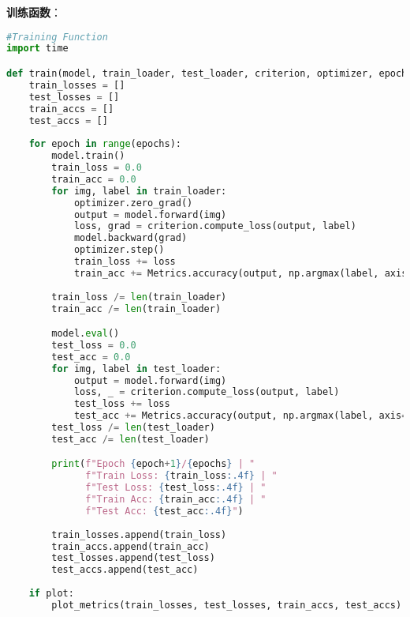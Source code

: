 \documentclass[a4paper, twocolumn]{article}
\begin{document}
\noindent \textbf{训练函数}：
\begin{lstlisting}[language=Python]
#Training Function
import time

def train(model, train_loader, test_loader, criterion, optimizer, epochs, plot=True):
    train_losses = []
    test_losses = []
    train_accs = []
    test_accs = []
    
    for epoch in range(epochs):
        model.train()
        train_loss = 0.0
        train_acc = 0.0
        for img, label in train_loader:
            optimizer.zero_grad()
            output = model.forward(img)
            loss, grad = criterion.compute_loss(output, label)
            model.backward(grad)
            optimizer.step()
            train_loss += loss
            train_acc += Metrics.accuracy(output, np.argmax(label, axis=1))
            
        train_loss /= len(train_loader)
        train_acc /= len(train_loader)

        model.eval()
        test_loss = 0.0
        test_acc = 0.0
        for img, label in test_loader:
            output = model.forward(img)
            loss, _ = criterion.compute_loss(output, label)
            test_loss += loss
            test_acc += Metrics.accuracy(output, np.argmax(label, axis=1))
        test_loss /= len(test_loader)
        test_acc /= len(test_loader)

        print(f"Epoch {epoch+1}/{epochs} | "
              f"Train Loss: {train_loss:.4f} | "
              f"Test Loss: {test_loss:.4f} | "
              f"Train Acc: {train_acc:.4f} | "
              f"Test Acc: {test_acc:.4f}")
        
        train_losses.append(train_loss)
        train_accs.append(train_acc)
        test_losses.append(test_loss)
        test_accs.append(test_acc)
        
    if plot:
        plot_metrics(train_losses, test_losses, train_accs, test_accs)
\end{lstlisting}
\end{document}
